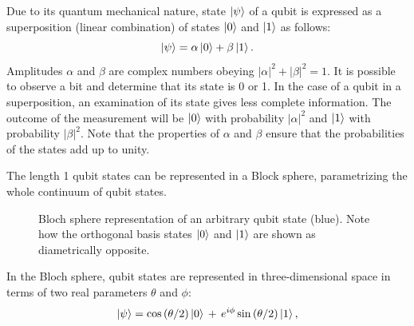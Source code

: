 Due to its quantum mechanical nature, state $\ket{\psi}$ of a qubit is expressed as a superposition (linear combination) of states $\ket{0}$ and $\ket{1}$ as follows:
\begin{equation}
    \ket{\psi}=\alpha\ket{0}+\beta\ket{1}.
\end{equation}
Amplitudes $\alpha$ and $\beta$ are complex numbers obeying $|\alpha|^2+|\beta|^2 = 1$. It is possible to observe a bit and determine that its state is 0 or 1. In the case of a qubit in a superposition, an examination of its state gives less complete information. The outcome of the measurement will be $\ket{0}$ with probability $|\alpha|^2$ and $\ket{1}$ with probability $|\beta|^2$. Note that the properties of $\alpha$ and $\beta$ ensure that the probabilities of the states add up to unity.

The length 1 qubit states can be represented in a Block sphere, parametrizing the whole continuum of qubit states.
\begin{figure}
    \centering
    \caption[Bloch sphere representation of a qubit state]{Bloch sphere representation of an arbitrary qubit state (blue). Note how the orthogonal basis states $\ket{0}$ and $\ket{1}$ are shown as diametrically opposite.}
    \label{fig:bloch_sphere}
    \end{figure}
In the Bloch sphere, qubit states are represented in three-dimensional space in terms of two real parameters $\theta$ and $\phi$:
\begin{equation}
    \ket{\psi} =\cos \left(\theta /2\right)\ket{0} \,+\,e^{i\phi }\sin \left(\theta /2\right)\ket{1},
\end{equation}

